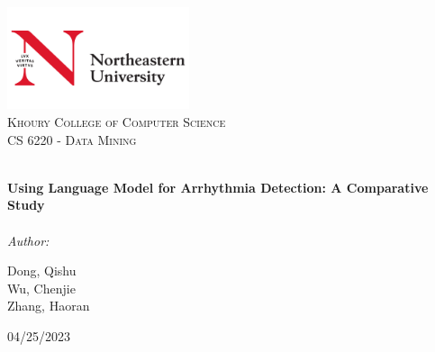 
\begin{titlepage}
\vbox{ }
\vbox{ }
\begin{center}
\includegraphics[width=0.40\textwidth]{latex-images/NEU-Logo.png}\\[1cm]
\textsc{\LARGE Khoury College of Computer Science}\\[1.5cm]
\textsc{\Large CS 6220 - Data Mining}\\[0.5cm]
\vbox{ }

\HRule \\[0.4cm]
{ \huge \bfseries Using Language Model for Arrhythmia Detection: A Comparative Study}\\[0.4cm]
\HRule \\[1.5cm]

\emph{Author:}

Dong, Qishu\\
Wu, Chenjie\\
Zhang, Haoran  

\vfill

{\large 04/25/2023}
\end{center}
\end{titlepage}